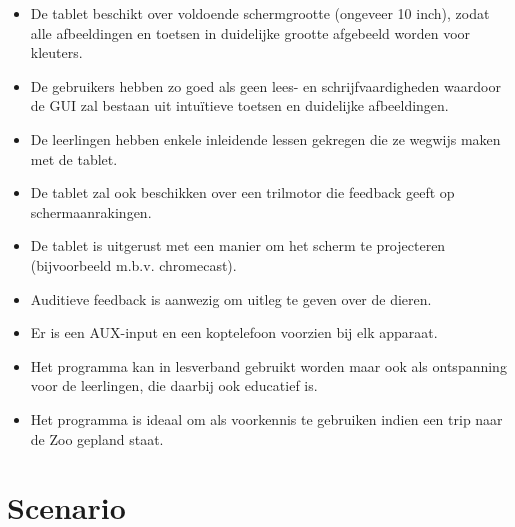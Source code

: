 \documentclass[12pt]{article}
\begin{document}
\vspace{5mm}

\begin{itemize}
	\item De tablet beschikt over voldoende schermgrootte (ongeveer 10 inch), zodat alle afbeeldingen en toetsen in duidelijke grootte afgebeeld worden voor kleuters.
	\item De gebruikers hebben zo goed als geen lees- en schrijfvaardigheden waardoor de GUI zal bestaan uit intu\"itieve toetsen en duidelijke afbeeldingen.
	\item De leerlingen hebben enkele inleidende lessen gekregen die ze wegwijs maken met de tablet.
	\item De tablet zal ook beschikken over een trilmotor die feedback geeft op schermaanrakingen.
	\item De tablet is uitgerust met een manier om het scherm te projecteren (bijvoorbeeld m.b.v. chromecast).
	\item Auditieve feedback is aanwezig om uitleg te geven over de dieren.
	\item Er is een AUX-input en een koptelefoon voorzien bij elk apparaat. 
	\item Het programma kan in lesverband gebruikt worden maar ook als ontspanning voor de leerlingen, die daarbij ook educatief is.
	\item Het programma is ideaal om als voorkennis te gebruiken indien een trip naar de Zoo gepland staat.
\end{itemize}

\clearpage

\section{Scenario}

\vspace{5mm}
\end{document}
